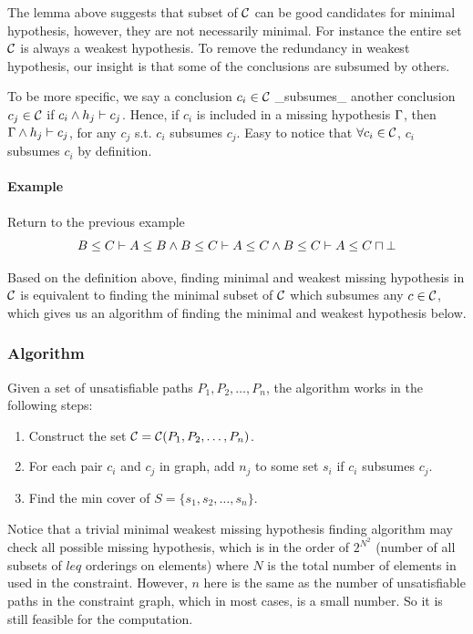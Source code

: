 
The lemma above suggests that subset of $\mathcal{C}$ can be good
candidates for minimal hypothesis, however, they are not necessarily
minimal. For instance the entire set $\mathcal{C}$ is always a weakest
hypothesis. To remove the redundancy in weakest hypothesis, our
insight is that some of the conclusions are subsumed by others. 

To be more specific, we say a conclusion $c_i \in \mathcal{C}$ 
_subsumes_ another conclusion $c_j\in \mathcal{C}$ if $c_i \land h_j
\vdash c_j$. Hence, if $c_i$ is included in a missing hypothesis
$\Gamma$, then $\Gamma \land h_j\vdash c_j$, for any $c_j$ s.t. $c_i$
subsumes $c_j$. Easy to notice that $\forall c_i \in \mathcal{C}$, $c_i$
subsumes $c_i$ by definition.

\paragraph{Example} Return to the previous example \[B\leq C \vdash
A\leq B \land B\leq C \vdash A\leq C \land B\leq C \vdash A\leq
C\sqcap \bot \]

Based on the definition above, finding minimal and weakest missing
hypothesis in $\mathcal{C}$ is equivalent to finding the minimal subset
of $\mathcal{C}$ which subsumes any $c\in \mathcal{C}$, which gives us an
algorithm of finding the minimal and weakest hypothesis below.

\subsubsection{Algorithm}

Given a set of unsatisfiable paths $P_1, P_2, \dots, P_n$, the
algorithm works in the following steps:

\begin{enumerate}
\item Construct the set $\mathcal{C} = \mathcal{C}(P_1, P_2, \dots,
P_n)$.

\item For each pair $c_i$ and $c_j$ in graph, add $n_j$ to some set
$s_i$ if $c_i$ subsumes $c_j$.

\item Find the min cover of $S=\{s_1, s_2, \dots, s_n\}$.
\end{enumerate}

Notice that a trivial minimal weakest missing hypothesis finding
algorithm may check all possible missing hypothesis, which is in the
order of $2^{N^2}$ (number of all subsets of $leq$ orderings on
elements) where $N$ is the total number of elements in used in the
constraint. However, $n$ here is the same as the number of
unsatisfiable paths in the constraint graph, which in most cases, is a
small number. So it is still feasible for the computation.

